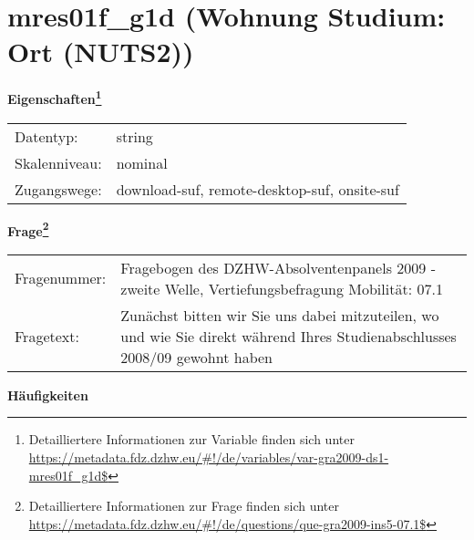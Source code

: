 
    \setcounter{footnote}{0}

    \vspace*{-1.8cm}
	\section{mres01f\_g1d (Wohnung Studium: Ort (NUTS2))}
	\label{section:mres01f_g1d}



    \vspace*{0.5cm}
    \noindent\textbf{Eigenschaften\footnote{Detailliertere Informationen zur Variable finden sich unter
		\url{https://metadata.fdz.dzhw.eu/\#!/de/variables/var-gra2009-ds1-mres01f_g1d$}}}\\
	\begin{tabularx}{\hsize}{@{}lX}
	Datentyp: & string \\
	Skalenniveau: & nominal \\
	Zugangswege: &
	  download-suf, 
	  remote-desktop-suf, 
	  onsite-suf
 \\
    \end{tabularx}



				\vspace*{0.5cm}
                \noindent\textbf{Frage\footnote{Detailliertere Informationen zur Frage finden sich unter
		              \url{https://metadata.fdz.dzhw.eu/\#!/de/questions/que-gra2009-ins5-07.1$}}}\\
				\begin{tabularx}{\hsize}{@{}lX}
					Fragenummer: &
					  Fragebogen des DZHW-Absolventenpanels 2009 - zweite Welle, Vertiefungsbefragung Mobilität:
					  07.1
 \\
					Fragetext: & Zunächst bitten wir Sie uns dabei mitzuteilen, wo und wie Sie direkt während Ihres Studienabschlusses 2008/09 gewohnt haben \\
				\end{tabularx}





        		\vspace*{0.5cm}
                \noindent\textbf{Häufigkeiten}

